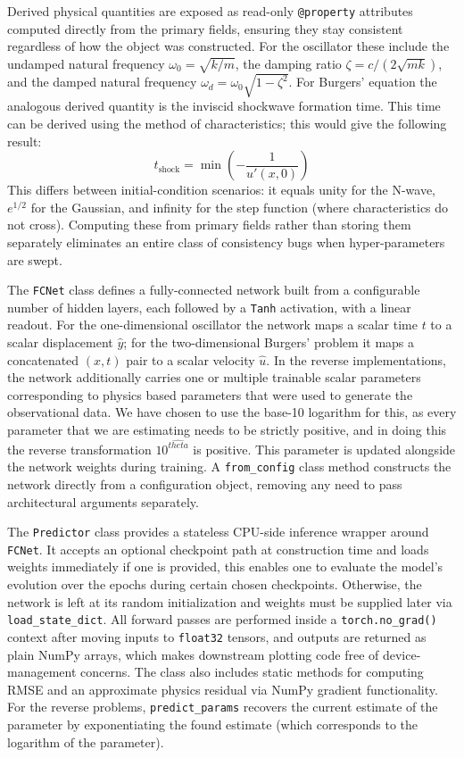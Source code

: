 \documentclass[12pt, a4paper]{report}
\begin{document}
Derived physical quantities are exposed as read-only \verb|@property| attributes computed directly from the primary fields, ensuring they stay consistent regardless of how the object was constructed. For the oscillator these include the undamped natural frequency $\omega_0 = \sqrt{k/m}$, the damping ratio $\zeta = c/(2\sqrt{mk})$, and the damped natural frequency $\omega_d = \omega_0\sqrt{1-\zeta^2}$. For Burgers' equation the analogous derived quantity is the inviscid shockwave formation time. This time can be derived using the method of characteristics; this would give the following result:
\[
t_\text{shock}=\min (-\frac{1}{u'(x,0)})
\]
This differs between initial-condition scenarios: it equals unity for the N-wave, $e^{1/2}$ for the Gaussian, and infinity for the step function (where characteristics do not cross).
Computing these from primary fields rather than storing them separately eliminates an entire class of consistency bugs when hyper-parameters are swept.

The \verb|FCNet| class defines a fully-connected network built from a configurable number of hidden layers, each followed by a \verb|Tanh| activation, with a linear readout. For the one-dimensional oscillator the network maps a scalar time $t$ to a scalar displacement $\hat{y}$; for the two-dimensional Burgers' problem it maps a concatenated $(x, t)$ pair to a scalar velocity $\hat{u}$. In the reverse implementations, the network additionally carries one or multiple trainable scalar parameters corresponding to physics based parameters that were used to generate the observational data. We have chosen to use the base-10 logarithm for this, as every parameter that we are estimating needs to be strictly positive, and in doing this the reverse transformation $10^{\hat{theta}}$ is positive. This parameter is updated alongside the network weights during training. A \verb|from_config| class method constructs the network directly from a configuration object, removing any need to pass architectural arguments separately.

The \verb|Predictor| class provides a stateless CPU-side inference wrapper around \verb|FCNet|. It accepts an optional checkpoint path at construction time and loads weights immediately if one is provided, this enables one to evaluate the model's evolution over the epochs during certain chosen checkpoints. Otherwise, the network is left at its random initialization and weights must be supplied later via \verb|load_state_dict|. All forward passes are performed inside a \verb|torch.no_grad()| context after moving inputs to \verb|float32| tensors, and outputs are returned as plain NumPy arrays, which makes downstream plotting code free of device-management concerns. The class also includes static methods for computing RMSE and an approximate physics residual via NumPy gradient functionality. For the reverse problems, \verb|predict_params| recovers the current estimate of the parameter by exponentiating the found estimate (which corresponds to the logarithm of the parameter). 
\end{document}
